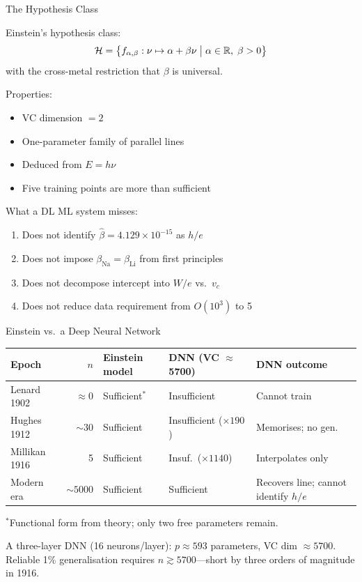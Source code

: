 \documentclass[aspectratio=169]{beamer}
\begin{document}
\begin{frame}{The Hypothesis Class}

Einstein's hypothesis class:
\[
  \mathcal{H} = \bigl\{f_{\alpha,\beta}: \nu \mapsto \alpha + \beta\nu
  \bigm| \alpha\in\mathbb{R},\;\beta>0\bigr\}
\]
with the cross-metal restriction that $\beta$ is universal.

\medskip
Properties:
\begin{itemize}
  \item VC dimension $= 2$
  \item One-parameter family of parallel lines
  \item Deduced  from $E = h\nu$
  \item Five training points are more than sufficient
\end{itemize}

\medskip
What a DL ML system misses:
\begin{enumerate}
  \item Does not  identify $\hat\beta = 4.129\times10^{-15}$ as $h/e$
  \item Does not  impose $\beta_{\mathrm{Na}} = \beta_{\mathrm{Li}}$
    from first principles
  \item Does not  decompose intercept into $W/e$ vs.\ $v_c$
  \item Does not  reduce data requirement from $O(10^3)$ to 5
\end{enumerate}

\end{frame}

\begin{frame}{Einstein vs.\ a Deep Neural Network}

\begin{center}
\small
\begin{tabular}{p{2.5cm}rp{2.7cm}p{2.8cm}p{3.5cm}}
\toprule
Epoch & $n$ & Einstein model & DNN (VC $\approx$ 5700) & DNN outcome \\
\midrule
Lenard 1902   & $\approx 0$  & Sufficient$^*$ & Insufficient
  & Cannot train \\
Hughes 1912   & $\sim 30$    & Sufficient
  & Insufficient ($\times 190$) & Memorises; no gen. \\
Millikan 1916 & 5            & Sufficient
  & Insuf.\ ($\times 1140$) & Interpolates only \\
Modern era    & $\sim 5000$  & Sufficient
  & Sufficient & Recovers line; cannot identify $h/e$ \\
\bottomrule
\end{tabular}
\end{center}

\medskip
{\small $^*$Functional form from theory; only two free parameters remain.}

\medskip
A three-layer DNN (16 neurons/layer): $p \approx 593$ parameters,
VC dim $\approx 5700$. Reliable 1\% generalisation requires
$n \gtrsim 5700$---short by three orders of magnitude in 1916.

\end{frame}
\end{document}
